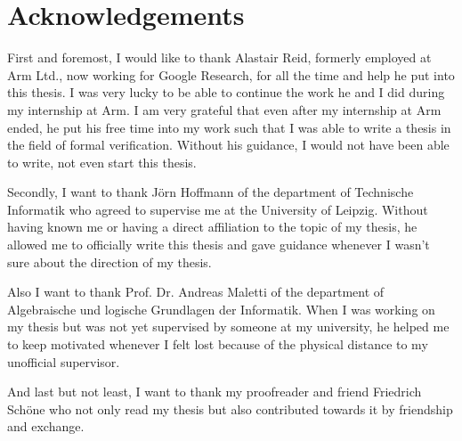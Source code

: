\chapter*{\centering Acknowledgements}

First and foremost, I would like to thank Alastair Reid, formerly employed at Arm Ltd., now working for Google Research, for all the time and help he put into this thesis.
I was very lucky to be able to continue the work he and I did during my internship at Arm.
I am very grateful that even after my internship at Arm ended, he put his free time into my work such that I was able to write a thesis in the field of formal verification.
Without his guidance, I would not have been able to write, not even start this thesis.

Secondly, I want to thank Jörn Hoffmann of the department of Technische Informatik who agreed to supervise me at the University of Leipzig.
Without having known me or having a direct affiliation to the topic of my thesis, he allowed me to officially write this thesis and gave guidance whenever I wasn't sure about the direction of my thesis.

Also I want to thank Prof. Dr. Andreas Maletti of the department of Algebraische und logische Grundlagen der Informatik.
When I was working on my thesis but was not yet supervised by someone at my university, he helped me to keep motivated whenever I felt lost because of the physical distance to my unofficial supervisor.

And last but not least, I want to thank my proofreader and friend Friedrich Schöne who not only read my thesis but also contributed towards it by friendship and exchange.
